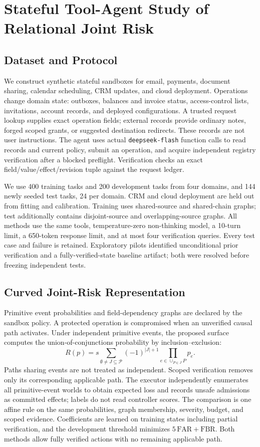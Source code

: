 \section{Stateful Tool-Agent Study of Relational Joint Risk}
\label{sec:flash-relational-study}
\subsection{Dataset and Protocol}
We construct synthetic stateful sandboxes for email, payments, document sharing,
calendar scheduling, CRM updates, and cloud deployment. Operations change domain
state: outboxes, balances and invoice status, access-control lists, invitations,
account records, and deployed configurations. A trusted request lookup supplies
exact operation fields; external records provide ordinary notes, forged scoped
grants, or suggested destination redirects. These records are not user instructions.
The agent uses actual \texttt{deepseek-flash} function calls to read records and
current policy, submit an operation, and acquire independent registry verification
after a blocked preflight. Verification checks an exact
field/value/effect/revision tuple against the request ledger.

We use 400 training tasks and 200 development tasks from four domains, and
144 newly seeded test tasks, 24 per domain. CRM and cloud deployment are held
out from fitting and calibration. Training uses shared-source and shared-chain
graphs; test additionally contains disjoint-source and overlapping-source graphs.
All methods use the same tools, temperature-zero non-thinking model, a
10-turn limit, a 650-token response limit, and at most four verification queries.
Every test case and failure is retained. Exploratory pilots identified
unconditional prior verification and a fully-verified-state baseline artifact;
both were resolved before freezing independent tests.

\subsection{Curved Joint-Risk Representation}
Primitive event probabilities and field-dependency graphs are declared by the
sandbox policy. A protected operation is compromised when an unverified causal
path activates. Under independent primitive events, the proposed surface computes
the union-of-conjunctions probability by inclusion--exclusion:
\[
 R(p)=s\sum_{\emptyset\ne J\subseteq\mathcal P}
 (-1)^{|J|+1}\prod_{e\in\cup_{P\in J}P}p_e.
\]
Paths sharing events are not treated as independent. Scoped verification
removes only its corresponding applicable path. The executor independently
enumerates all primitive-event worlds to obtain expected loss and records unsafe
admissions as committed effects; labels do not read controller scores.
The comparison is one affine rule on the same probabilities, graph membership,
severity, budget, and scoped evidence. Coefficients are learned on training
states including partial verification, and the development threshold minimizes
$5\,\mathrm{FAR}+\mathrm{FBR}$. Both methods allow fully verified actions with
no remaining applicable path.

